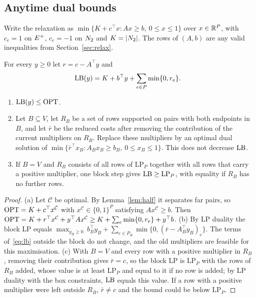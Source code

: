 \subsection{Anytime dual bounds}\label{sec:dual}

Write the relaxation as $\min\{K+c^\top x: Ax\ge b,\ 0\le x\le 1\}$ over
$x\in\mathbb{R}^P$, with $c_e=1$ on $E^{+}$, $c_e=-1$ on $N_{2}$ and $K=|N_{2}|$.  The rows
of $(A,b)$ are any valid inequalities from Section~\ref{sec:relax}.

\begin{theorem}\label{thm:anytime}
For every $y\ge 0$ let $r=c-A^\top y$ and
\begin{equation}\label{eq:lb}
\mathrm{LB}(y)=K+b^\top y+\sum_{e\in P}\min\{0,r_e\}.
\end{equation}
\begin{enumerate}
\item[(a)] $\mathrm{LB}(y)\le\mathrm{OPT}$.
\item[(b)] Let $B\subseteq V$, let $R_B$ be a set of rows supported on pairs
with both endpoints in $B$, and let $\bar r$ be the reduced costs after
removing the contribution of the current multipliers on $R_B$.  Replace these
multipliers by an optimal dual solution of
$\min\{\bar r^\top x_B: A_Bx_B\ge b_B,\ 0\le x_B\le 1\}$.  This does not
decrease $\mathrm{LB}$.
\item[(c)] If $B=V$ and $R_B$ consists of all rows of $\mathrm{LP}_P$
together with all rows that carry a positive multiplier, one block step gives
$\mathrm{LB}\ge\mathrm{LP}_P$, with equality if $R_B$ has no further rows.
\end{enumerate}
\end{theorem}
\begin{proof}
(a) Let $\mathcal C$ be optimal.  By Lemma~\ref{lem:half} it separates far
pairs, so $\mathrm{OPT}=K+c^\top x^{\mathcal C}$ with $x^{\mathcal C}\in\{0,1\}^P$
satisfying $Ax^{\mathcal C}\ge b$.  Then
$\mathrm{OPT}=K+r^\top x^{\mathcal C}+y^\top Ax^{\mathcal C}\ge K+\sum_e\min\{0,r_e\}+y^\top b$.
(b) By LP duality the block LP equals
$\max_{y_B\ge0}\ b_B^\top y_B+\sum_{e\in P_B}\min\{0,(\bar r-A_B^\top
y_B)_e\}$.  The terms of~\eqref{eq:lb} outside the block do not change, and
the old multipliers are feasible for this maximisation.  (c) With $B=V$ and
every row with a positive multiplier in $R_B$, removing their contribution
gives $\bar r=c$, so the block LP is $\mathrm{LP}_P$ with the rows of $R_B$
added, whose value is at least $\mathrm{LP}_P$ and equal to it if no row is
added; by LP duality with the box constraints, $\mathrm{LB}$ equals this value.  If a
row with a positive multiplier were left outside $R_B$, $\bar r\ne c$ and the
bound could be below $\mathrm{LP}_P$.
\end{proof}

